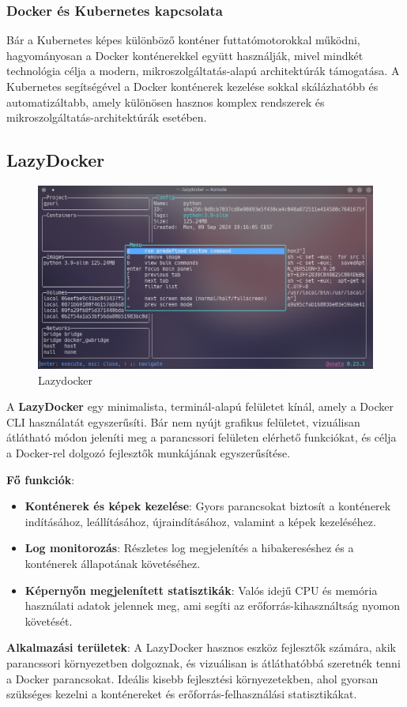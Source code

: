 \subsubsection{Docker és Kubernetes kapcsolata}

Bár a Kubernetes képes különböző konténer futtatómotorokkal működni, hagyományosan a Docker konténerekkel együtt használják, mivel mindkét technológia célja a modern, mikroszolgáltatás-alapú architektúrák támogatása. A Kubernetes segítségével a Docker konténerek kezelése sokkal skálázhatóbb és automatizáltabb, amely különösen hasznos komplex rendszerek és mikroszolgáltatás-architektúrák esetében.


\subsection{LazyDocker}

\begin{figure}[H]
	\centering
	\includegraphics[width=0.7\linewidth]{images/lazydocker}
	\caption[]{Lazydocker}
	\label{fig:lazydocker}
\end{figure}

A \textbf{LazyDocker} egy minimalista, terminál-alapú felületet kínál, amely a Docker CLI használatát egyszerűsíti. Bár nem nyújt grafikus felületet, vizuálisan átlátható módon jeleníti meg a parancssori felületen elérhető funkciókat, és célja a Docker-rel dolgozó fejlesztők munkájának egyszerűsítése.



\textbf{Fő funkciók}:
\begin{itemize}
	\item \textbf{Konténerek és képek kezelése}: Gyors parancsokat biztosít a konténerek indításához, leállításához, újraindításához, valamint a képek kezeléséhez.
	\item \textbf{Log monitorozás}: Részletes log megjelenítés a hibakereséshez és a konténerek állapotának követéséhez.
	\item \textbf{Képernyőn megjelenített statisztikák}: Valós idejű CPU és memória használati adatok jelennek meg, ami segíti az erőforrás-kihasználtság nyomon követését.
\end{itemize}

\textbf{Alkalmazási területek}:
A LazyDocker hasznos eszköz fejlesztők számára, akik parancssori környezetben dolgoznak, és vizuálisan is átláthatóbbá szeretnék tenni a Docker parancsokat. Ideális kisebb fejlesztési környezetekben, ahol gyorsan szükséges kezelni a konténereket és erőforrás-felhasználási statisztikákat.